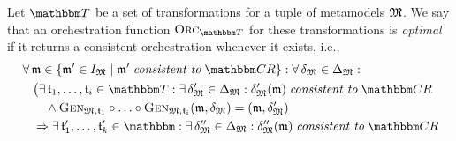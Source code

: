 \begin{definition}
    Let $\transformationset{T}$ be a set of transformations for a tuple of metamodels $\metamodeltuple{M}%
    $.
    We say that an orchestration function $\orcfunction{\transformationset{T}}$ for these transformations is \emph{optimal} if it returns a consistent orchestration whenever it exists, i.e.,
    \begin{align*}
        &
        \forall \modeltuple{m} \in \setted{\modeltuple{m}' \in \metamodeltupleinstanceset{M} \mid \modeltuple{m}' \consistenttomath \consistencyrelationset{CR}} : \forall \changetuple{\metamodeltuple{M}} %
        \in \changeuniverse{\metamodeltuple{M}} : \\
        & \formulaskip
            \bigl(
            \exists \transformation{t}_{1}, \dots, \transformation{t}_{i} \in \transformationset{T} : 
            \exists \changetuple{\metamodeltuple{M}}' %
            \in \changeuniverse{\metamodeltuple{M}} : \changetuple{\metamodeltuple{M}}'(\modeltuple{m})
            \consistenttomath \consistencyrelationset{CR}\\
            & \formulaskip \formulaskip
            \land \generalizationfunction{\metamodeltuple{M}, \transformation{t}_{1}} \concatfunction \dots \concatfunction \generalizationfunction{\metamodeltuple{M}, \transformation{t}_{i}}(\modeltuple{m}, \changetuple{\metamodeltuple{M}}) = (\modeltuple{m}, \changetuple{\metamodeltuple{M}}') %
            \\
            & \formulaskip
            \Rightarrow %
            \exists \transformation{t}_{1}', \dots, \transformation{t}_{k}' \in \transformationset{} : 
            \exists \changetuple{\metamodeltuple{M}}'' %
            \in \changeuniverse{\metamodeltuple{M}} : \changetuple{\metamodeltuple{M}}''(\modeltuple{m}) \consistenttomath \consistencyrelationset{CR}\\

\end{align*}
\end{definition}
